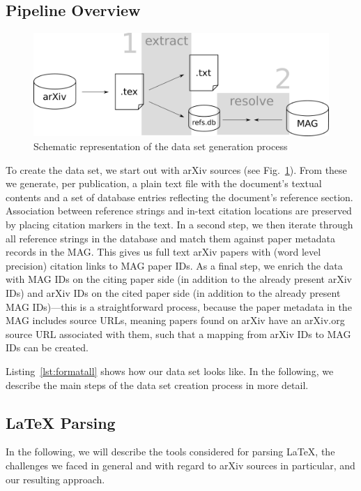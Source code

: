 \subsection{Pipeline Overview}

\begin{figure}[tb]
  \centering
    \includegraphics[width=.7\textwidth]{figures/corpus/Fig1.pdf}
  \caption{Schematic representation of the data set generation process}
  \label{fig:datagen}
\end{figure}

To create the data set, we start out with arXiv sources (see Fig.~\ref{fig:datagen}). From these we generate, per publication, a plain text file with the document's textual contents and a set of database entries reflecting the document's reference section. Association between reference strings and in-text citation locations are preserved by placing citation markers in the text. In a second step, we then iterate through all reference strings in the database and match them against paper metadata records in the MAG. This gives us full text arXiv papers with (word level precision) citation links to MAG paper IDs. As a final step, we enrich the data with MAG IDs on the citing paper side (in addition to the already present arXiv IDs) and arXiv IDs on the cited paper side (in addition to the already present MAG IDs)---this is a straightforward process, because the paper metadata in the MAG includes source URLs, meaning papers found on arXiv have an arXiv.org source URL associated with them, such that a mapping from arXiv IDs to MAG IDs can be created.

Listing~\ref{lst:formatall} shows how our data set looks like. In the following, we describe the main steps of the data set creation process in more detail.

\subsection{\LaTeX{} Parsing}
In the following, we will describe the tools considered for parsing \LaTeX{}, the challenges we faced in general and with regard to arXiv sources in particular, and our resulting approach.

